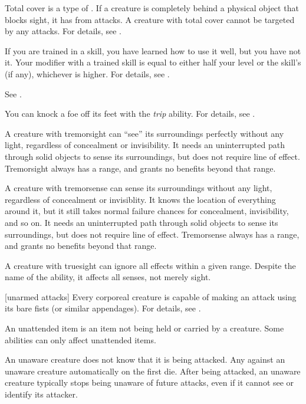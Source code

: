  Total cover is a type of .
If a creature is completely behind a physical object that blocks sight, it has  from attacks.
A creature with total cover cannot be targeted by any attacks.
For details, see .

 If you are trained in a skill, you have learned how to use it well, but you have not  it.
Your modifier with a trained skill is equal to either half your level  or the skill's  (if any), whichever is higher.
For details, see .

 See .

 You can knock a foe off its feet with the \textit{trip} ability.
For details, see .

 A creature with tremorsight can ``see'' its surroundings perfectly without any light, regardless of concealment or invisibility.
It needs an uninterrupted path through solid objects to sense its surroundings, but does not require line of effect.
Tremorsight always has a range, and grants no benefits beyond that range.

 A creature with tremorsense can sense its surroundings without any light, regardless of concealment or invisiblity.
It knows the location of everything around it, but it still takes normal failure chances for concealment, invisibility, and so on.
It needs an uninterrupted path through solid objects to sense its surroundings, but does not require line of effect.
Tremorsense always has a range, and grants no benefits beyond that range.

 A creature with truesight can ignore all  effects within a given range.
Despite the name of the ability, it affects all senses, not merely sight.

[unarmed attacks] Every corporeal creature is capable of making an attack using its bare fists (or similar appendages).
For details, see .

 An unattended item is an item not being held or carried by a creature.
Some abilities can only affect unattended items.

 An unaware creature does not know that it is being attacked.
Any  against an unaware creature automatically  on the first die.
After being attacked, an unaware creature typically stops being unaware of future attacks, even if it cannot see or identify its attacker.

